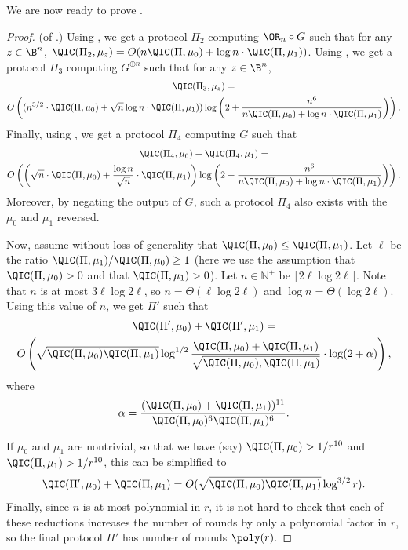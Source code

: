 We are now ready to prove .

\begin{proof} (of .)
Using , we get a protocol $\Pi_2$
computing $\OR_n\circ G$ such that for any $z\in\B^n$,
$\QIC(\Pi_2,\mu_z)=O(n\QIC(\Pi,\mu_0)+\log n\cdot\QIC(\Pi,\mu_1))$.
Using , we get a protocol $\Pi_3$
computing $G^{\oplus n}$ such that for any $z\in\B^n$,
\begin{multline*}
\QIC(\Pi_3,\mu_z)=\\
O\left((n^{3/2}\cdot\QIC(\Pi,\mu_0)+
\sqrt{n}\log n\cdot\QIC(\Pi,\mu_1))\log\left(2+\frac{n^6}
{n\QIC(\Pi,\mu_0)+\log n\cdot\QIC(\Pi,\mu_1)}\right)\right).
\end{multline*}
Finally, using , we get a protocol $\Pi_4$
computing $G$ such that
\begin{multline*}
\QIC(\Pi_4,\mu_0)+\QIC(\Pi_4,\mu_1)=\\
O\left(\left(\sqrt{n}\cdot\QIC(\Pi,\mu_0)+
\frac{\log n}{\sqrt{n}}\cdot\QIC(\Pi,\mu_1)\right)
\log\left(2+\frac{n^6}
{n\QIC(\Pi,\mu_0)+\log n\cdot\QIC(\Pi,\mu_1)}\right)\right).
\end{multline*}
Moreover, by negating the output of $G$, such a protocol
$\Pi_4$ also exists with the $\mu_0$ and $\mu_1$ reversed.

Now, assume without loss of generality that
$\QIC(\Pi,\mu_0)\le\QIC(\Pi,\mu_1)$.
Let $\ell$ be the ratio $\QIC(\Pi,\mu_1)/\QIC(\Pi,\mu_0)\ge 1$
(here we use the assumption that $\QIC(\Pi,\mu_0)>0$
and that $\QIC(\Pi,\mu_1)>0$).
Let $n\in\mathbb{N}^+$ be $\lceil2\ell\log2\ell\rceil$. Note that $n$
is at most $3\ell\log 2\ell$, so $n=\Theta(\ell\log 2\ell)$
and $\log n=\Theta(\log 2\ell)$. Using this value of $n$,
we get $\Pi'$ such that
\begin{multline*}
\QIC(\Pi',\mu_0)+\QIC(\Pi',\mu_1)=\\
O\left(\sqrt{\QIC(\Pi,\mu_0)\QIC(\Pi,\mu_1)}\log^{1/2}
\frac{\QIC(\Pi,\mu_0)+\QIC(\Pi,\mu_1)}
    {\sqrt{\QIC(\Pi,\mu_0),\QIC(\Pi,\mu_1)}}
    \cdot\log(2+\alpha)\right),
\end{multline*}
where 
\[\alpha=\frac{(\QIC(\Pi,\mu_0)+\QIC(\Pi,\mu_1))^{11}}
    {\QIC(\Pi,\mu_0)^6\QIC(\Pi,\mu_1)^6}.\]

If $\mu_0$ and $\mu_1$ are nontrivial, so that we have (say)
$\QIC(\Pi,\mu_0)>1/r^{10}$ and $\QIC(\Pi,\mu_1)>1/r^{10}$,
this can be simplified to
\[\QIC(\Pi',\mu_0)+\QIC(\Pi,\mu_1)
=O(\sqrt{\QIC(\Pi,\mu_0)\QIC(\Pi,\mu_1)}\log^{3/2} r).\]
Finally, since $n$ is at most polynomial in $r$, it is not
hard to check that each of these reductions increases the number
of rounds by only a polynomial factor in $r$, so the final
protocol $\Pi'$ has number of rounds $\poly(r)$.
\end{proof}




